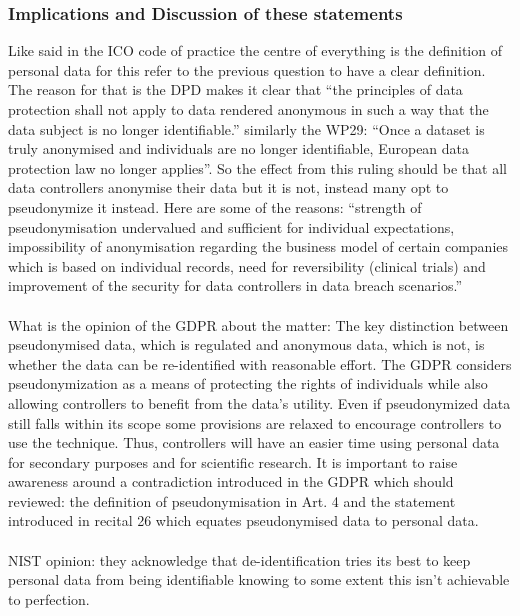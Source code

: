 \documentclass[9pt]{article}
\begin{document}
\subsubsection{Implications and Discussion of these statements}
Like said in the ICO code of practice \cite{code of practice} the centre of everything is the definition of personal data for this refer to the previous question to have a clear definition. 
The reason for that is the DPD makes it clear that \enquote{the principles of data protection shall not apply to data rendered anonymous in such a way that the data subject is no longer identifiable.}\cite{CJEU - DPD 1995} similarly the WP29: \enquote{Once a dataset is truly anonymised and individuals are no longer identifiable, European data protection law no longer applies}. So the effect from this ruling should be that all data controllers anonymise their data but it is not, instead many opt to pseudonymize it instead. Here are some of the reasons: \enquote{strength of pseudonymisation undervalued and sufficient for individual expectations, impossibility of anonymisation regarding the business model of certain companies which is based on individual records, need for reversibility (clinical trials) and improvement of the security for data controllers in data breach scenarios.}\cite{Pseudonymisation}\\\\
What is the opinion of the GDPR about the matter: The key distinction between pseudonymised data, which is regulated and anonymous data, which is not, is whether the data can be re-identified with reasonable effort.\cite{GDPR:2016}
The GDPR considers pseudonymization as a means of protecting the rights of individuals while also allowing controllers to benefit from the data’s utility. Even if pseudonymized data still falls within its scope some provisions are relaxed to encourage controllers to use the technique. Thus, controllers will have an easier time using personal data for secondary purposes and for scientific research. It is important to raise awareness around a contradiction introduced in the GDPR which should reviewed: the definition of pseudonymisation in Art. 4 and the statement introduced in recital 26 which equates pseudonymised data to personal data.\cite{Sophie:2016}\cite{GDPR:2014}\\\\
NIST opinion: they acknowledge that de-identification tries its best to keep personal data from being identifiable knowing to some extent this isn't achievable to perfection.\cite{NIST:2015} \\
\end{document}
